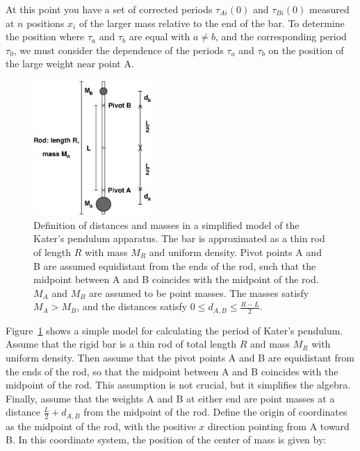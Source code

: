 \documentclass{revtex4}
\begin{document}
At this point you have a set of corrected periods $\tau_{Ai}(0)$ and
$\tau_{Bi}(0)$ measured at $n$ positions $x_i$ of the larger
mass relative to the end of the bar. To determine the position where $\tau_a$ and $\tau_b$ are equal with $a \ne b$, and the corresponding period $\tau_0$, we must consider the dependence of the periods $\tau_a$ and $\tau_b$ on the position of the large weight near point A.
\begin{figure}[h]
  \begin{center}
    \includegraphics[width=0.4\textwidth]{KatersModelFig.eps}
  \end{center}
  \caption{\label{fig:Katersmodel} Definition of distances and masses in a simplified model of the Kater's pendulum apparatus. The bar is approximated as a thin rod of length $R$ with mass $M_R$ and uniform density. Pivot points A and B are assumed equidistant from the ends of the rod, such that the midpoint between A and B coincides with the midpoint of the rod. $M_A$ and $M_B$ are assumed to be point masses. The masses satisfy $M_A > M_B$, and the distances satisfy $0 \le d_{A,B} \le \frac{R-L}{2}$.}
\end{figure} 
Figure~\ref{fig:Katersmodel} shows a simple model for calculating the period of Kater's pendulum. Assume that the rigid bar is a thin rod of total length $R$ and mass $M_R$ with uniform density. Then assume that the pivot points A and B are equidistant from the ends of the rod, so that the midpoint between A and B coincides with the midpoint of the rod. This assumption is not crucial, but it simplifies the algebra. Finally, assume that the weights A and B at either end are point masses at a distance $\frac{L}{2} + d_{A,B}$ from the midpoint of the rod. Define the origin of coordinates as the midpoint of the rod, with the positive $x$ direction pointing from A toward B. In this coordinate system, the position of the center of mass is given by: 
\end{document}
